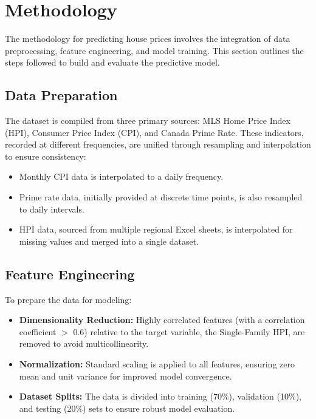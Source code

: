 \section{Methodology}

The methodology for predicting house prices involves the integration of data preprocessing, feature engineering, and model training. This section outlines the steps followed to build and evaluate the predictive model.

\subsection{Data Preparation}
The dataset is compiled from three primary sources: MLS Home Price Index (HPI), Consumer Price Index (CPI), and Canada Prime Rate. These indicators, recorded at different frequencies, are unified through resampling and interpolation to ensure consistency:
\begin{itemize}
    \item Monthly CPI data is interpolated to a daily frequency.
    \item Prime rate data, initially provided at discrete time points, is also resampled to daily intervals.
    \item HPI data, sourced from multiple regional Excel sheets, is interpolated for missing values and merged into a single dataset.
\end{itemize}

\subsection{Feature Engineering}
To prepare the data for modeling:
\begin{itemize}
    \item \textbf{Dimensionality Reduction:} Highly correlated features (with a correlation coefficient $>$ 0.6) relative to the target variable, the Single-Family HPI, are removed to avoid multicollinearity.
    \item \textbf{Normalization:} Standard scaling is applied to all features, ensuring zero mean and unit variance for improved model convergence.
    \item \textbf{Dataset Splits:} The data is divided into training (70\%), validation (10\%), and testing (20\%) sets to ensure robust model evaluation.
\end{itemize}

